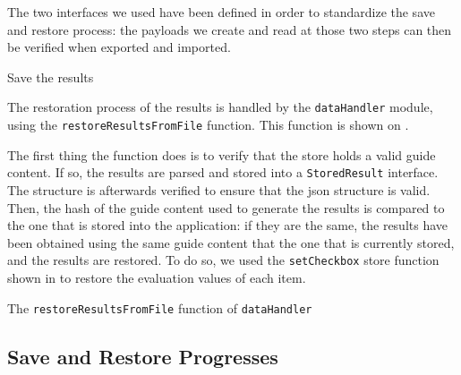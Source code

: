 The two interfaces we used have been defined in order to standardize the save and restore process: the payloads we create and read at those two steps can then be verified when exported and imported.

\begin{listing}[!ht] 
	\caption{Save the results}
	\label{lst:app_implementation_save}
\end{listing}

The restoration process of the results is handled by the \texttt{dataHandler} module, using the \texttt{restoreResultsFromFile} function. This function is shown on .

The first thing the function does is to verify that the store holds a valid guide content. If so, the results are parsed and stored into a \texttt{StoredResult} interface. The structure is afterwards verified to ensure that the \gls{json} structure is valid. Then, the hash of the guide content used to generate the results is compared to the one that is stored into the application: if they are the same, the results have been obtained using the same guide content that the one that is currently stored, and the results are restored. To do so, we used the \texttt{setCheckbox} store function shown in  to restore the evaluation values of each item.

\begin{listing}[!ht] 
	\caption{The \texttt{restoreResultsFromFile} function of \texttt{dataHandler}}
	\label{lst:app_implementation_restore_function}
\end{listing}

\subsection{Save and Restore Progresses}
\label{subsec:app_implementation_restoreprogress}

